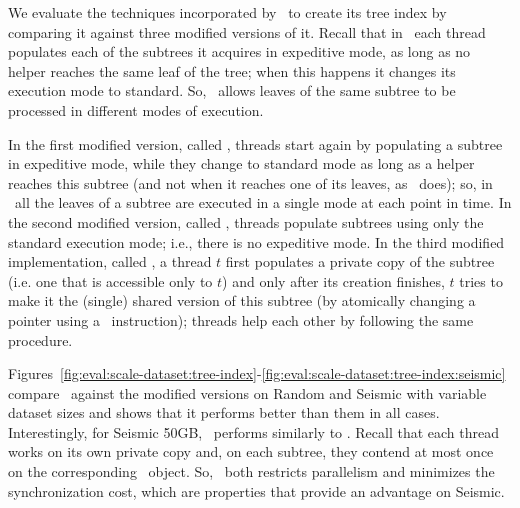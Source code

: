 
We evaluate the techniques incorporated by \Fresh\ to create its
tree index by comparing it against three modified versions of it. 
Recall that in \Fresh\ each thread populates each of the subtrees it
acquires in expeditive mode, as long as no helper reaches the same leaf of the tree;
when this happens it changes its execution mode to standard. 
So, \Fresh\ allows leaves of the same subtree to be processed in different
modes of execution.

In the first modified version, called \FreshSub, threads start again by populating 
a subtree in expeditive mode, while they change to standard mode as long as a helper 
reaches this subtree (and not when it reaches one of its leaves, as \Fresh\ does); 
so, in \FreshSub\ all the leaves of a subtree are executed in a single mode at each 
point in time. 
In the second modified version, called \FreshSTD, threads populate subtrees using only 
the standard execution mode; i.e., there is no expeditive mode.
In the third modified implementation, called \FreshTreeCopy, a thread $t$ first populates a private
copy of the subtree (i.e. one that is accessible only to $t$) and only after its creation finishes,
$t$ tries to make it the (single) shared version of this subtree (by atomically changing a pointer 
using a \CAS\ instruction); threads help each other by following the same procedure.

Figures~\ref{fig:eval:scale-dataset:tree-index}-\ref{fig:eval:scale-dataset:tree-index:seismic}
compare \Fresh\ against the modified versions 
on Random and Seismic with variable dataset sizes and shows that it performs better than them
in all cases. Interestingly, for Seismic 50GB, \Fresh\ performs similarly to \FreshTreeCopy.
Recall that each thread works on its own private copy and, on each subtree, they contend at most once 
on the corresponding \CAS\ object. So, \FreshTreeCopy\ both restricts parallelism and minimizes the 
synchronization cost, which are properties that provide an advantage on Seismic. 



